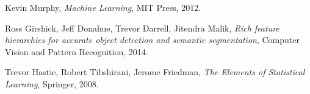 \documentclass [11pt,letterpaper ,twoside ,openany ]{report}
\begin{document}
\begin{thebibliography}{9}
          Kevin Murphy,
          \textit{Machine Learning},
          MIT Press,
          2012.            

          Ross Girshick, Jeff Donahue, Trevor Darrell, Jitendra Malik,
          \textit{Rich feature hierarchies for accurate object detection and semantic segmentation},
          Computer Vision and Pattern Recognition,
          2014.                                           

          Trevor Hastie, Robert Tibshirani, Jerome Friedman,
          \textit{The Elements of Statistical Learning},
          Springer,
          2008.                                                         

    \end{thebibliography}
\end{document}
